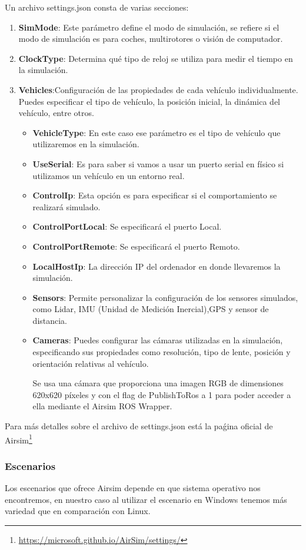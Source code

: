 Un archivo settings.json consta de varias secciones: 
\begin{enumerate}
  \item \textbf{SimMode}: Este parámetro define el modo de simulación, se refiere si el modo de simulación es para coches, multirotores o visión de computador.
  \item \textbf{ClockType}: Determina qué tipo de reloj se utiliza para medir el tiempo en la simulación. 
  \item \textbf{Vehicles}:Configuración de  las propiedades de cada vehículo individualmente. Puedes especificar el tipo de vehículo, la posición inicial, la dinámica del vehículo, entre otros.
  \begin{itemize}
    \item \textbf{VehicleType}: En este caso ese parámetro es el tipo de vehículo que utilizaremos en la simulación.
    \item \textbf{UseSerial}: Es para saber si vamos a usar un puerto serial en físico si utilizamos un vehículo en un entorno real.
    \item \textbf{ControlIp}: Esta opción es para especificar si el comportamiento se realizará simulado.
    \item \textbf{ControlPortLocal}: Se especificará el puerto Local. 
    \item \textbf{ControlPortRemote}: Se especificará el puerto Remoto.
    \item \textbf{LocalHostIp}: La dirección IP del ordenador en donde llevaremos la simulación.
    \item \textbf{Sensors}: Permite personalizar la configuración de los sensores simulados, como Lidar, IMU (Unidad de Medición Inercial),GPS y sensor de distancia. 
    \item \textbf{Cameras}: Puedes configurar las cámaras utilizadas en la simulación, especificando sus propiedades como resolución, tipo de lente, posición y orientación relativas al vehículo. 
    
    Se usa una cámara que proporciona una imagen RGB de dimensiones 620x620 píxeles y con
    el flag de PublishToRos a 1 para poder acceder a ella mediante el Airsim ROS Wrapper.
  \end{itemize}
\end{enumerate}

Para más detalles sobre el archivo de settings.json está la paǵina oficial de Airsim\footnote{\url{https://microsoft.github.io/AirSim/settings/}} 

\subsubsection{Escenarios}
\label{sec:airsim}
Los escenarios que ofrece Airsim depende en que sistema operativo nos encontremos, en nuestro caso al utilizar el escenario en Windows 
tenemos más variedad que en comparación con Linux. 

